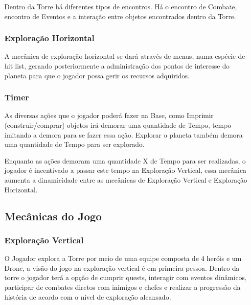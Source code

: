 \documentclass[11pt]{article} %
\begin{document}
Dentro da Torre há diferentes tipos de encontros. Há o encontro de Combate, encontro de Eventos e a interação entre objetos encontrados dentro da Torre.

\subsubsection{Exploração Horizontal}
A mecânica de exploração horizontal se dará através de menus, numa espécie de hit list, gerando posteriormente a administração dos pontos de interesse do planeta para que o jogador possa gerir os recursos adquiridos.

\subsubsection{Timer}
As diversas ações que o jogador poderá fazer na Base, como Imprimir (construir/comprar) objetos irá demorar uma quantidade de Tempo, tempo imitando a demora para se fazer essa ação. Explorar o planeta também demora uma quantidade de Tempo para ser explorado.

Enquanto as ações demoram uma quantidade X de Tempo para ser realizadas, o jogador é incentivado a passar este tempo na Exploração Vertical, essa mecânica aumenta a dinamicidade entre as mecânicas de Exploração Vertical e Exploração Horizontal.

\subsection{Mecânicas do Jogo}

\subsubsection{Exploração Vertical}
O Jogador explora a Torre por meio de uma equipe composta de 4 heróis e um Drone, a visão do jogo na exploração vertical é em primeira pessoa. Dentro da torre o jogador terá a opção de cumprir quests, interagir com eventos dinâmicos, participar de combates diretos com inimigos e chefes e realizar a progressão da história de acordo com o nível de exploração alcansado.
\end{document}
